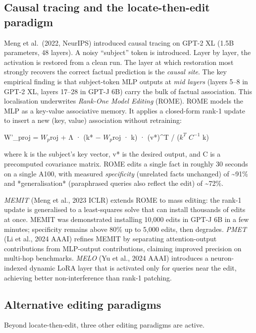 \documentclass{article}
\begin{document}
\subsection{Causal tracing and the locate-then-edit paradigm}\label{causal-tracing-and-the-locate-then-edit-paradigm}

Meng et al.~(2022, NeurIPS) introduced causal tracing on GPT-2 XL (1.5B parameters, 48 layers). A noisy ``subject'' token is introduced. Layer by layer, the activation is restored from a clean run. The layer at which restoration most strongly recovers the correct factual prediction is the \emph{causal site}. The key empirical finding is that subject-token MLP outputs at \emph{mid layers} (layers 5--8 in GPT-2 XL, layers 17--28 in GPT-J 6B) carry the bulk of factual association. This localisation underwrites \emph{Rank-One Model Editing} (ROME). ROME models the MLP as a key-value associative memory. It applies a closed-form rank-1 update to insert a new (key, value) association without retraining:

W'\_proj = \(W_p\)roj + Λ · (k* − \(W_p\)roj · k) · (v*)\^{}T / (\(k^T\) \(C^{-1}\) k)

where k is the subject's key vector, v* is the desired output, and C is a precomputed covariance matrix. ROME edits a single fact in roughly 30 seconds on a single A100, with measured \emph{specificity} (unrelated facts unchanged) of \textasciitilde91\% and *generalisation* (paraphrased queries also reflect the edit) of \textasciitilde72\%.

\emph{MEMIT} (Meng et al., 2023 ICLR) extends ROME to mass editing: the rank-1 update is generalised to a least-squares solve that can install thousands of edits at once. MEMIT was demonstrated installing 10,000 edits in GPT-J 6B in a few minutes; specificity remains above 80\% up to 5,000 edits, then degrades. \emph{PMET} (Li et al., 2024 AAAI) refines MEMIT by separating attention-output contributions from MLP-output contributions, claiming improved precision on multi-hop benchmarks. \emph{MELO} (Yu et al., 2024 AAAI) introduces a neuron-indexed dynamic LoRA layer that is activated only for queries near the edit, achieving better non-interference than rank-1 patching.

\subsection{Alternative editing paradigms}\label{alternative-editing-paradigms}

Beyond locate-then-edit, three other editing paradigms are active.
\end{document}
